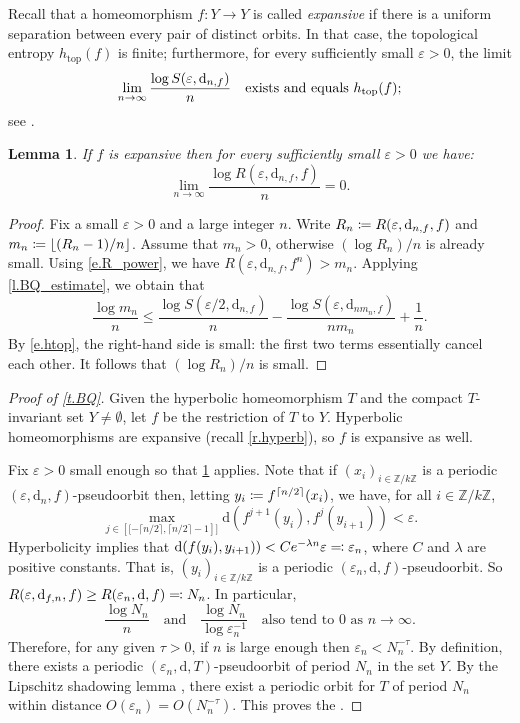 \documentclass[10pt]{amsart}
\newcommand{\ldbrack}{[\![}
\newcommand{\rdbrack}{]\!]}
\def\vcentcolon{\mathrel{\mathop\ordinarycolon}}
\providecommand\ordinarycolon{:}
\providecommand*\coloneqq{\vcentcolon\mathrel{\mkern-1.2mu}=}
\providecommand*\eqqcolon{=\mathrel{\mkern-1.2mu}\vcentcolon}
\let\eqcolon\eqqcolon
\theoremstyle{plain}
\newtheorem{lemma}[theorem]{Lemma}
\theoremstyle{definition}
\newcommand{\ZZ}{\mathbb{Z}}
\newcommand{\dd}{\mathrm{d}}
\let\epsilon\varepsilon
\begin{document}
Recall that a homeomorphism $f \colon Y \to Y$ is called \emph{expansive} if there is a uniform separation between every pair of distinct orbits. In that case, the topological entropy $h_\mathrm{top}(f)$ is finite; furthermore, for every sufficiently small $\epsilon>0$, the limit
\begin{equation}\label{e.htop}
\lim_{n \to \infty} \frac{\log S(\epsilon,\dd_{n,f})}{n} \quad \text{exists and equals } h_\mathrm{top}(f); \nopagebreak
\end{equation}
see \cite[p.\,174, 177]{Walters}.

\begin{lemma}\label{p.subexp}
If $f$ is expansive then for every sufficiently small $\epsilon>0$ we have:
\[
\lim_{n \to \infty} \frac{\log R(\epsilon,\dd_{n,f},f)}{n} = 0.
\]
\end{lemma}

\begin{proof}
Fix a small $\epsilon>0$ and a large integer $n$.
Write $R_n \coloneqq R(\epsilon,\dd_{n,f},f)$ and $m_n \coloneqq \lfloor (R_n-1)/n \rfloor$.
Assume that $m_n>0$, otherwise $(\log R_n)/n$ is already small.
Using \eqref{e.R_power}, we have $R(\epsilon,\dd_{n,f},f^n) > m_n$.
Applying \cref{l.BQ_estimate}, we obtain that
\[
\frac{\log m_n}{n} \le \frac{\log S(\epsilon/2, \dd_{n,f})}{n} - \frac{\log S(\epsilon, \dd_{nm_n,f})}{nm_n} + \frac{1}{n}.
\]
By \eqref{e.htop}, the right-hand side is small: the first two terms essentially cancel each other.
It follows that $(\log R_n)/n$ is small.
\end{proof}

\begin{proof}[Proof of \cref{t.BQ}]
Given the hyperbolic homeomorphism $T$ and the compact $T$\nobreakdash-invariant set $Y \neq \emptyset$, let
$f$ be the restriction of $T$ to $Y$.
Hyperbolic homeomorphisms are expansive (recall \cref{r.hyperb}), so $f$ is expansive as well.

Fix $\epsilon>0$ small enough so that \cref{p.subexp} applies.
Note that if $(x_i)_{i \in \ZZ/k\ZZ}$ is a periodic $(\epsilon, \dd_n,f)$-pseudoorbit then, letting $y_i \coloneqq f^{\lceil n/2 \rceil}(x_i)$, we have, for all $i \in \ZZ/k\ZZ$,
\[
\max_{j \in \left\ldbrack -\lceil n/2 \rceil, \lceil n/2 \rceil -1 \right\rdbrack}
\dd ( f^{j+1}(y_i), f^j(y_{i+1}) ) < \epsilon.
\]
Hyperbolicity implies that
$\dd ( f(y_i), y_{i+1}) ) < C e^{-\lambda n} \epsilon \eqcolon \epsilon_n$,
where $C$ and $\lambda$ are positive constants.
That is, $(y_i)_{i \in \ZZ/k\ZZ}$ is a periodic $(\epsilon_n, \dd, f)$-pseudoorbit.
So $R(\epsilon, \dd_{f,n}, f) \ge R(\epsilon_n, \dd, f) \eqcolon N_n$.
In particular,
\[
\frac{\log N_n}{n} \quad\text{and}\quad
\frac{\log N_n}{\log \epsilon_n^{-1}}
\quad\text{also tend to $0$ as $n \to \infty$.}
\]
Therefore, for any given $\tau>0$, if $n$ is large enough then $\epsilon_n < N_n^{-\tau}$.
By definition, there exists a periodic $(\epsilon_n, \dd, T)$-pseudoorbit of period $N_n$ in the set $Y$.
By the Lipschitz shadowing lemma \cite[Th.\,2]{Sakai}, there exist a periodic orbit for $T$ of period $N_n$ within distance $O(\epsilon_n) = O(N_n^{-\tau})$.
This proves the .
\end{proof}
\end{document}
